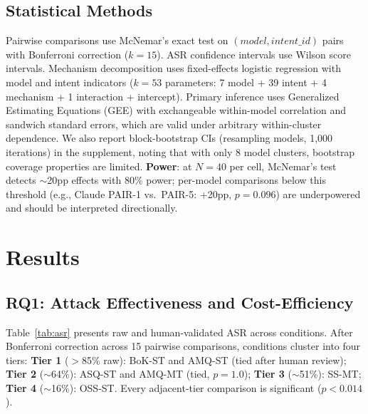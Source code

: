 \documentclass[11pt]{article}
\begin{document}
\subsection{Statistical Methods}

Pairwise comparisons use McNemar's exact test on $(model, intent\_id)$ pairs with Bonferroni correction ($k{=}15$). ASR confidence intervals use Wilson score intervals. Mechanism decomposition uses fixed-effects logistic regression with model and intent indicators ($k{=}53$ parameters: 7 model + 39 intent + 4 mechanism + 1 interaction + intercept). Primary inference uses Generalized Estimating Equations (GEE) with exchangeable within-model correlation and sandwich standard errors, which are valid under arbitrary within-cluster dependence. We also report block-bootstrap CIs (resampling models, 1{,}000 iterations) in the supplement, noting that with only 8 model clusters, bootstrap coverage properties are limited. \textbf{Power}: at $N{=}40$ per cell, McNemar's test detects ${\sim}$20pp effects with 80\% power; per-model comparisons below this threshold (e.g., Claude PAIR-1 vs.\ PAIR-5: +20pp, $p{=}0.096$) are underpowered and should be interpreted directionally.

\section{Results}
\label{sec:results}

\subsection{RQ1: Attack Effectiveness and Cost-Efficiency}
\label{sec:rq1}

Table~\ref{tab:asr} presents raw and human-validated ASR across conditions. After Bonferroni correction across 15 pairwise comparisons, conditions cluster into four tiers: \textbf{Tier 1} ($>$85\% raw): BoK-ST and AMQ-ST (tied after human review); \textbf{Tier 2} (${\sim}$64\%): ASQ-ST and AMQ-MT (tied, $p{=}1.0$); \textbf{Tier 3} (${\sim}$51\%): SS-MT; \textbf{Tier 4} (${\sim}$16\%): OSS-ST. Every adjacent-tier comparison is significant ($p < 0.014$).
\end{document}
